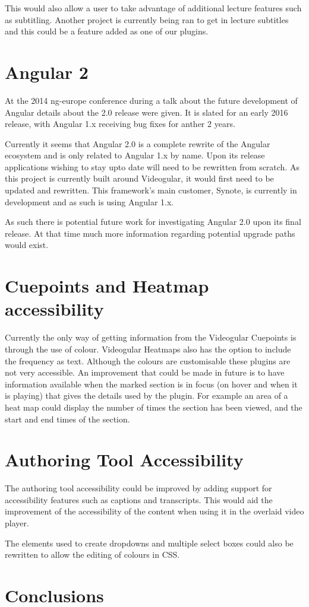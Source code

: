 This would also allow a user to take advantage of additional lecture features such as subtitling. Another project is currently being ran to get in lecture subtitles and this could be a feature added as one of our plugins.

\section{Angular 2}

At the 2014 ng-europe conference during a talk about the future development of Angular details about the 2.0 release were given. It is slated for an early 2016 release, with Angular 1.x receiving bug fixes for anther 2 years.

Currently it seems that Angular 2.0 is a complete rewrite of the Angular ecosystem and is only related to Angular 1.x by name. Upon its release applications wishing to stay upto date will need to be rewritten from scratch. As this project is currently built around Videogular, it would first need to be updated and rewritten. This framework's main customer, Synote, is currently in development and as such is using Angular 1.x. 

As such there is potential future work for investigating Angular 2.0 upon its final release. At that time much more information regarding potential upgrade paths would exist.

\section{Cuepoints and Heatmap accessibility}
Currently the only way of getting information from the \gls{Videogular} Cuepoints is through the use of colour. \gls{Videogular} Heatmaps also has the option to include the frequency as text. Although the colours are customisable these plugins are not very accessible. An improvement that could be made in future is to have information available when the marked section is in focus (on hover and when it is playing) that gives the details used by the plugin. For example an area of a heat map could display the number of times the section has been viewed, and the start and end times of the section.

\section{Authoring Tool Accessibility}
The authoring tool accessibility could be improved by adding support for accessibility features such as captions and transcripts. This would aid the improvement of the accessibility of the content when using it in the overlaid video player.

The elements used to create dropdowns and multiple select boxes could also be rewritten to allow the editing of colours in \gls{CSS}.



\section{Conclusions}
